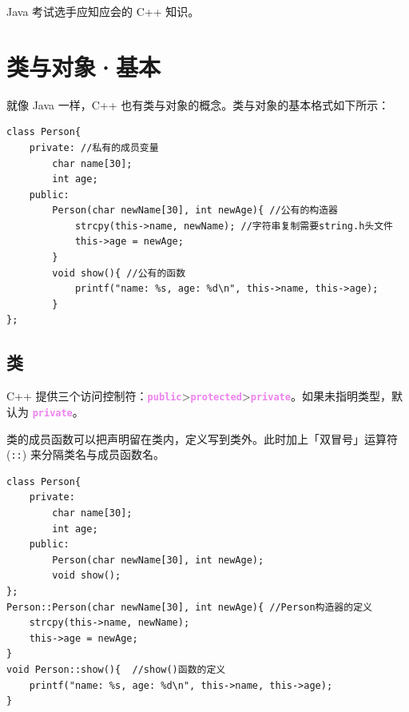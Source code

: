 \documentclass[UTF8]{ctexart}
\newcommand\keyword[1]{\textcolor{violet}{\textbf{\texttt{#1}}}}
\begin{document}
{\color{cyan!50!black}
Java 考试选手应知应会的 C++ 知识。
}

\section{类与对象·基本}
就像 Java 一样，C++ 也有类与对象的概念。类与对象的基本格式如下所示：

\begin{lstlisting}
class Person{
	private: //私有的成员变量
		char name[30];
		int age;
	public:
		Person(char newName[30], int newAge){ //公有的构造器
			strcpy(this->name, newName); //字符串复制需要string.h头文件
			this->age = newAge;
		}
		void show(){ //公有的函数
			printf("name: %s, age: %d\n", this->name, this->age);
		}
};
\end{lstlisting}

\subsection{类}

C++ 提供三个访问控制符：\keyword{public}>\keyword{protected}>\keyword{private}。如果未指明类型，默认为 \keyword{private}。

类的成员函数可以把声明留在类内，定义写到类外。此时加上「双冒号」运算符 (\verb!::!) 来分隔类名与成员函数名。

\begin{lstlisting}
class Person{
	private:
		char name[30];
		int age;
	public:
		Person(char newName[30], int newAge);
		void show();
};
Person::Person(char newName[30], int newAge){ //Person构造器的定义
	strcpy(this->name, newName);
	this->age = newAge;
}
void Person::show(){  //show()函数的定义
	printf("name: %s, age: %d\n", this->name, this->age);
}
\end{lstlisting}
\end{document}
